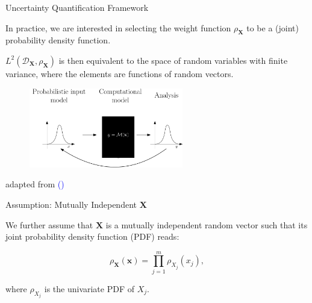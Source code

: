 \documentclass[english,aspectratio=169]{beamer}
\renewcommand{\emph}[1]{\textcolor[HTML]{006d2c}{\fontseries{sb}\selectfont #1}}
\begin{document}
\begin{frame}[fragile]{Uncertainty Quantification Framework}
\small

\vspace{-1.5em}

\begin{exampleblock}{}
  In practice, we are interested in selecting the weight function $\rho_{\boldsymbol{X}}$
  to be a \emph{(joint) probability density function}.

  \vspace{0.5em}

  $L^2(\mathcal{D}_{\boldsymbol{X}}, \rho_{\boldsymbol{X}})$ is then equivalent to
  the space of random variables with \emph{finite variance},
  where the elements are functions of random vectors.
\end{exampleblock}

\begin{figure}
  \centering
  \includegraphics[width=0.6\textwidth]{./figures/uq_framework_blackbox}
\end{figure}

\vspace{-2.0em}

{\hfill \raggedright \tiny adapted from \textcolor{blue}{(\cite{Marelli2014})}}
\end{frame}

\begin{frame}[fragile]{Assumption: Mutually Independent $\bm{X}$}
\small

We further assume that $\bm{X}$ is a mutually independent random vector
such that its joint probability density function (PDF) reads:

\begin{equation*}
  \rho_{\bm{X}}(\bm{x}) = \prod_{j = 1}^m \rho_{X_j} (x_j),
\end{equation*}

where $\rho_{X_j}$ is the univariate PDF of $X_j$.

\end{frame}
\end{document}
